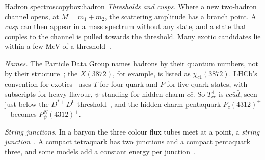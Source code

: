 \begin{primer}{Hadron spectroscopy}{box:hadron}
\emph{Thresholds and cusps.} Where a new two-hadron channel opens, at $M=m_1+m_2$, the scattering amplitude has a branch point. A
\emph{cusp} can then appear in a mass spectrum without any state, and a state that couples to the channel is pulled towards the threshold.
Many exotic candidates lie within a few MeV of a threshold~\cite{guo2018}.

\emph{Names.} The Particle Data Group names hadrons by their quantum numbers, not by their structure~\cite{navas2024}; the
$X(3872)$, for example, is listed as $\chi_{c1}(3872)$. LHCb's convention for exotics~\cite{lhcb2022n} uses $T$ for four-quark and $P$
for five-quark states, with subscripts for heavy flavour, $\psi$ standing for hidden charm $c\bar c$. So $T_{cc}^+$ is $cc\bar u\bar d$,
seen just below the $D^{*+}D^0$ threshold~\cite{lhcb2022h}, and the hidden-charm pentaquark $P_c(4312)^+$~\cite{lhcb2019h} becomes
$P_\psi^N(4312)^+$.

\emph{String junctions.} In a baryon the three colour flux tubes meet at a point, a \emph{string junction}~\cite{rossiveneziano1977}. A
compact tetraquark has two junctions and a compact pentaquark three, and some models add a constant energy per
junction~\cite{karliner2017a}.
\end{primer}

